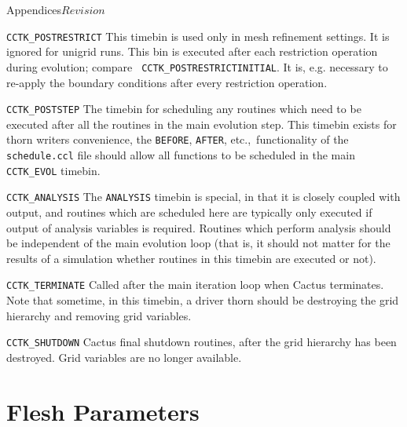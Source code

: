 \begin{cactuspart}{Appendices}{}{$Revision$}
\begin{Lentry}
\item[{\tt CCTK\_POSTRESTRICT}]
        This timebin is used only in mesh refinement settings.  It is
        ignored for unigrid runs.  This bin is executed after each
        restriction operation during evolution; compare {\tt
          CCTK\_POSTRESTRICTINITIAL}.  It is, e.g. necessary to
        re-apply the
        boundary conditions after every restriction operation.

\item[{\tt CCTK\_POSTSTEP}]
        The timebin for scheduling any routines which need to be 
        executed after all the routines in the main evolution step. This 
        timebin exists for thorn writers convenience, the {\tt BEFORE}, 
        {\tt AFTER}, etc.,\ functionality of the {\tt schedule.ccl} file
        should allow all functions to be scheduled in the main {\tt CCTK\_EVOL}
        timebin.

\item[{\tt CCTK\_ANALYSIS}]
        The {\tt ANALYSIS} timebin is special, in that it is closely coupled 
        with output, and routines which are scheduled here are typically
        only executed if output of analysis variables is required. 
        Routines which perform analysis should be independent of the main 
        evolution loop (that is, it should not matter for the results
        of a simulation whether routines in this timebin are executed or 
        not). 

\item[{\tt CCTK\_TERMINATE}]
        Called after the main iteration loop when Cactus terminates. 
        Note that sometime, in this timebin, a driver thorn should be 
        destroying the grid hierarchy and removing grid variables. 

\item[{\tt CCTK\_SHUTDOWN}]
        Cactus final shutdown routines, after the grid hierarchy has been 
        destroyed. Grid variables are no longer available.

\end{Lentry}


\chapter{Flesh Parameters}


\end{cactuspart}
